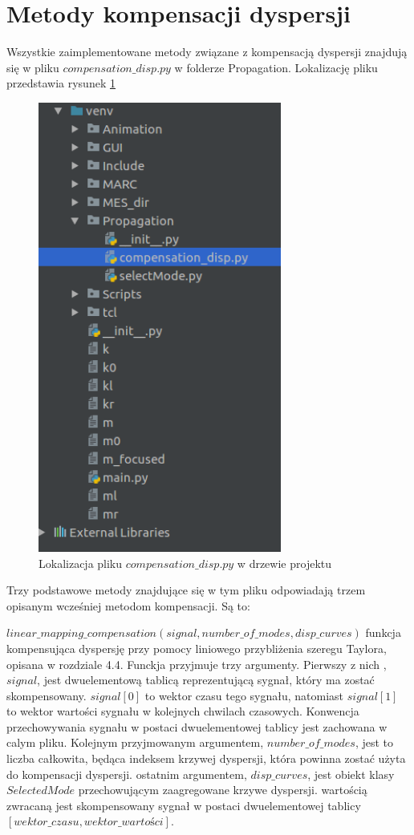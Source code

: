 \section{Metody kompensacji dyspersji}

Wszystkie zaimplementowane metody związane z kompensacją dyspersji znajdują się w pliku $compensation\_disp.py$ w folderze Propagation. Lokalizację pliku przedstawia rysunek \ref{fig:compensation}
\begin{figure}[h]
\centering
\includegraphics[width=8cm]{Zdjecia/5/kasia/compensation}
\caption{Lokalizacja pliku $compensation\_disp.py$ w drzewie projektu}
\label{fig:compensation}
\end{figure}

Trzy podstawowe metody znajdujące się w tym pliku odpowiadają trzem opisanym wcześniej metodom kompensacji. Są to:

$linear\_mapping\_compensation(signal, number\_of\_modes, disp\_curves)$ funkcja kompensująca dyspersję przy pomocy liniowego przybliżenia szeregu Taylora, opisana w rozdziale 4.4. Funckja przyjmuje trzy argumenty. Pierwszy z nich , $signal$, jest dwuelementową tablicą reprezentującą sygnał, który ma zostać skompensowany. $signal[0]$ to wektor czasu tego sygnału, natomiast $signal[1]$ to wektor wartości sygnału w kolejnych chwilach czasowych. Konwencja przechowywania sygnału w postaci dwuelementowej tablicy jest zachowana w calym pliku. Kolejnym przyjmowanym argumentem, $number\_of\_modes$, jest to liczba całkowita, będąca indeksem krzywej dyspersji, która powinna zostać użyta do kompensacji dyspersji. ostatnim argumentem, $disp\_curves$, jest obiekt klasy $SelectedMode$ przechowującym zaagregowane krzywe dyspersji. wartością zwracaną jest skompensowany sygnał w postaci dwuelementowej tablicy $[wektor\_czasu, wektor\_wartości]$.

